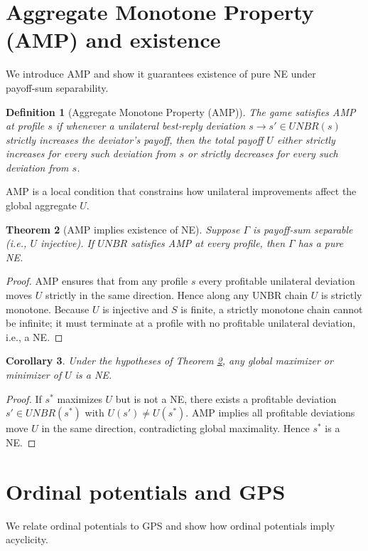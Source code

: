 \documentclass[11pt]{article}
\newtheorem{theorem}{Theorem}[section]
\newtheorem{corollary}[theorem]{Corollary}
\newtheorem{definition}[theorem]{Definition}
\begin{document}
\section{Aggregate Monotone Property (AMP) and existence}
We introduce AMP and show it guarantees existence of pure NE under
payoff‑sum separability.

\begin{definition}[Aggregate Monotone Property (AMP)]
The game satisfies AMP at profile \(s\) if whenever a unilateral best‑reply
deviation \(s\to s'\in UNBR(s)\) strictly increases the deviator's payoff,
then the total payoff \(U\) either strictly increases for every such
deviation from \(s\) or strictly decreases for every such deviation from \(s\).
\end{definition}

AMP is a local condition that constrains how unilateral improvements affect
the global aggregate \(U\).

\begin{theorem}[AMP implies existence of NE]
\label{thm:AMP}
Suppose \(\Gamma\) is payoff‑sum separable (i.e., \(U\) injective). If \(UNBR\)
satisfies AMP at every profile, then \(\Gamma\) has a pure NE.
\end{theorem}

\begin{proof}
AMP ensures that from any profile \(s\) every profitable unilateral deviation
moves \(U\) strictly in the same direction. Hence along any UNBR chain \(U\)
is strictly monotone. Because \(U\) is injective and \(S\) is finite, a
strictly monotone chain cannot be infinite; it must terminate at a profile
with no profitable unilateral deviation, i.e., a NE.
\end{proof}

\begin{corollary}
Under the hypotheses of Theorem \ref{thm:AMP}, any global maximizer or
minimizer of \(U\) is a NE.
\end{corollary}

\begin{proof}
If \(s^\ast\) maximizes \(U\) but is not a NE, there exists a profitable
deviation \(s'\in UNBR(s^\ast)\) with \(U(s')\ne U(s^\ast)\). AMP implies all
profitable deviations move \(U\) in the same direction, contradicting global
maximality. Hence \(s^\ast\) is a NE.
\end{proof}

\section{Ordinal potentials and GPS}
We relate ordinal potentials to GPS and show how ordinal potentials imply
acyclicity.
\end{document}

